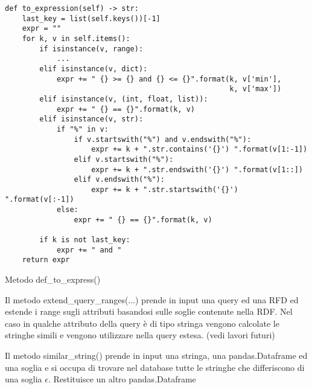 \begin{listing}[H]
\begin{verbatim}
def to_expression(self) -> str:
    last_key = list(self.keys())[-1]
    expr = ""
    for k, v in self.items():
        if isinstance(v, range):
            ...
        elif isinstance(v, dict):
            expr += " {} >= {} and {} <= {}".format(k, v['min'],
                                                    k, v['max'])
        elif isinstance(v, (int, float, list)):
            expr += " {} == {}".format(k, v)
        elif isinstance(v, str):
            if "%" in v:
                if v.startswith("%") and v.endswith("%"):
                    expr += k + ".str.contains('{}') ".format(v[1:-1])
                elif v.startswith("%"):
                    expr += k + ".str.endswith('{}') ".format(v[1::])
                elif v.endswith("%"):
                    expr += k + ".str.startswith('{}') ".format(v[:-1])
            else:
                expr += " {} == {}".format(k, v)

        if k is not last_key:
            expr += " and "
    return expr
\end{verbatim}
\caption{Metodo def{\_}to{\_}express()}
\label{Code:9}
\end{listing}

Il metodo extend{\_}query{\_}ranges(...) prende in input una query ed una RFD ed estende i range sugli attributi basandosi sulle soglie contenute nella RDF. Nel caso in qualche attributo della query è di tipo stringa vengono calcolate le stringhe simili e vengono utilizzare nella query estesa.
(vedi lavori futuri)


Il metodo similar{\_}string() prende in input una stringa, una pandas.Dataframe ed una soglia e si occupa di trovare nel database tutte le stringhe che differiscono di una soglia $\epsilon$. Restituisce un altro pandas.Dataframe 